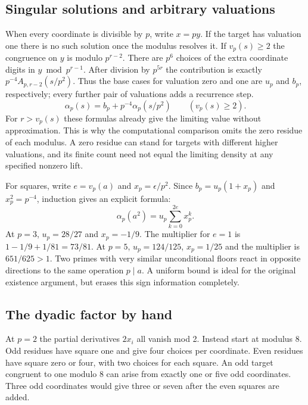 \documentclass[12pt,letterpaper]{article}
\begin{document}
\clearpage\subsection{Singular solutions and arbitrary valuations}
When every coordinate is divisible by \(p\), write \(x=py\). If the target has valuation one there is no such solution once the modulus resolves it. If \(v_p(s)\ge2\) the congruence on \(y\) is modulo \(p^{r-2}\). There are \(p^6\) choices of the extra coordinate digits in \(y\bmod p^{r-1}\). After division by \(p^{5r}\) the contribution is exactly \(p^{-4}A_{p,r-2}(s/p^2)\). Thus the base cases for valuation zero and one are \(u_p\) and \(b_p\), respectively; every further pair of valuations adds a recurrence step.
\[
           \alpha_p(s)=b_p+p^{-4}\alpha_p(s/p^2)
                    \qquad(v_p(s)\ge2).
\]
For \(r>v_p(s)\) these formulas already give the limiting value without approximation. This is why the computational comparison omits the zero residue of each modulus. A zero residue can stand for targets with different higher valuations, and its finite count need not equal the limiting density at any specified nonzero lift.

For squares, write \(e=v_p(a)\) and \(x_p=\epsilon/p^2\). Since \(b_p=u_p(1+x_p)\) and \(x_p^2=p^{-4}\), induction gives an explicit formula:
\[
             \alpha_p(a^2)=u_p\sum_{k=0}^{2e}x_p^k.
\]
At \(p=3\), \(u_p=28/27\) and \(x_p=-1/9\). The multiplier for \(e=1\) is \(1-1/9+1/81=73/81\). At \(p=5\), \(u_p=124/125\), \(x_p=1/25\) and the multiplier is \(651/625>1\). Two primes with very similar unconditional floors react in opposite directions to the same operation \(p\mid a\). A uniform bound is ideal for the original existence argument, but erases this sign information completely.

\clearpage\subsection{The dyadic factor by hand}
At \(p=2\) the partial derivatives \(2x_i\) all vanish mod 2. Instead start at modulus 8. Odd residues have square one and give four choices per coordinate. Even residues have square zero or four, with two choices for each square. An odd target congruent to one modulo 8 can arise from exactly one or five odd coordinates. Three odd coordinates would give three or seven after the even squares are added.
\end{document}
